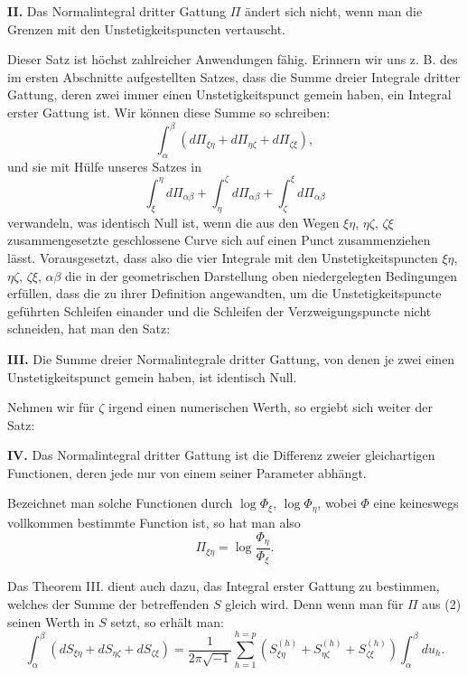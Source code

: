\documentclass[10pt]{article}
\begin{document}
\noindent\textbf{II.} Das Normalintegral dritter Gattung \(\Pi\) ändert sich nicht, wenn man die Grenzen mit den Unstetigkeitspuncten vertauscht.

Dieser Satz ist höchst zahlreicher Anwendungen fähig. Erinnern wir uns z. B. des im ersten Abschnitte aufgestellten Satzes, dass die Summe dreier Integrale dritter Gattung, deren zwei immer einen Unstetigkeitspunct gemein haben, ein Integral erster Gattung ist. Wir können diese Summe so schreiben:
\[
\int_{\alpha}^{\beta}\left(d\Pi_{\xi\eta}+d\Pi_{\eta\zeta}+d\Pi_{\zeta\xi}\right),
\]
und sie mit Hülfe unseres Satzes in
\[
\int_{\xi}^{\eta}d\Pi_{\alpha\beta}+\int_{\eta}^{\zeta}d\Pi_{\alpha\beta}+\int_{\zeta}^{\xi}d\Pi_{\alpha\beta}
\]
verwandeln, was identisch Null ist, wenn die aus den Wegen \(\xi\eta\), \(\eta\zeta\), \(\zeta\xi\) zusammengesetzte geschlossene Curve sich auf einen Punct zusammenziehen lässt. Vorausgesetzt, dass also die vier Integrale mit den Unstetigkeitspuncten \(\xi\eta\), \(\eta\zeta\), \(\zeta\xi\), \(\alpha\beta\) die in der geometrischen Darstellung oben niedergelegten Bedingungen erfüllen, dass die zu ihrer Definition angewandten, um die Unstetigkeitspuncte geführten Schleifen einander und die Schleifen der Verzweigungspuncte nicht schneiden, hat man den Satz:

\noindent\textbf{III.} Die Summe dreier Normalintegrale dritter Gattung, von denen je zwei einen Unstetigkeitspunct gemein haben, ist identisch Null.

Nehmen wir für \(\zeta\) irgend einen numerischen Werth, so ergiebt sich weiter der Satz:

\noindent\textbf{IV.} Das Normalintegral dritter Gattung ist die Differenz zweier gleichartigen Functionen, deren jede nur von einem seiner Parameter abhängt.

Bezeichnet man solche Functionen durch \(\log \Phi_\xi\), \(\log \Phi_\eta\), wobei \(\Phi\) eine keineswegs vollkommen bestimmte Function ist, so hat man also
\[
\tag{4}
\Pi_{\xi\eta}=\log\frac{\Phi_\eta}{\Phi_\xi}.
\]

Das Theorem III. dient auch dazu, das Integral erster Gattung zu bestimmen, welches der Summe der betreffenden \(S\) gleich wird. Denn wenn man für \(\Pi\) aus (2) seinen Werth in \(S\) setzt, so erhält man:
\[
\tag{5}
\int_{\alpha}^{\beta}\left(dS_{\xi\eta}+dS_{\eta\zeta}+dS_{\zeta\xi}\right)
=\frac{1}{2\pi\sqrt{-1}}\sum_{h=1}^{h=p}
\left(S_{\xi\eta}^{(h)}+S_{\eta\zeta}^{(h)}+S_{\zeta\xi}^{(h)}\right)
\int_{\alpha}^{\beta}du_h.
\]
\end{document}
